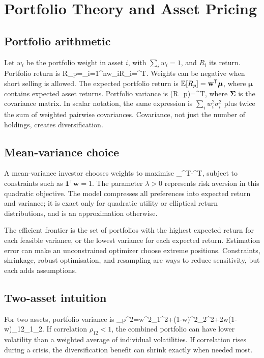 \chapter{Portfolio Theory and Asset Pricing}

\section{Portfolio arithmetic}
Let $w_i$ be the portfolio weight in asset $i$, with $\sum_iw_i=1$, and $R_i$ its return. Portfolio return is
  R_p=\sum_{i=1}^{n}w_iR_i=^{\mathsf T}.
\closeformula
Weights can be negative when short selling is allowed. The expected portfolio return is $\mathbb{E}[R_p]=\mathbf{w}^{\mathsf T}\boldsymbol\mu$, where $\boldsymbol\mu$ contains expected asset returns. Portfolio variance is
  \Var(R_p)=^{\mathsf T}\boldsymbol\Sigma{},
\closeformula
where $\boldsymbol\Sigma$ is the covariance matrix. In scalar notation, the same expression is $\sum_iw_i^2\sigma_i^2$ plus twice the sum of weighted pairwise covariances. Covariance, not just the number of holdings, creates diversification.

\section{Mean-variance choice}
A mean-variance investor chooses weights to maximise
  \max_{}\quad {}^{\mathsf T}\boldsymbol\mu-^{\mathsf T}\boldsymbol\Sigma{},
\closeformula
subject to constraints such as $\mathbf{1}^{\mathsf T}\mathbf{w}=1$. The parameter $\lambda>0$ represents risk aversion in this quadratic objective. The model compresses all preferences into expected return and variance; it is exact only for quadratic utility or elliptical return distributions, and is an approximation otherwise.

The efficient frontier is the set of portfolios with the highest expected return for each feasible variance, or the lowest variance for each expected return. Estimation error can make an unconstrained optimizer choose extreme positions. Constraints, shrinkage, robust optimisation, and resampling are ways to reduce sensitivity, but each adds assumptions.

\section{Two-asset intuition}
For two assets, portfolio variance is
  \sigma_p^2=w^2\sigma_1^2+(1-w)^2\sigma_2^2+2w(1-w)\rho_{12}\sigma_1\sigma_2.
\closeformula
If correlation $\rho_{12}<1$, the combined portfolio can have lower volatility than a weighted average of individual volatilities. If correlation rises during a crisis, the diversification benefit can shrink exactly when needed most.

